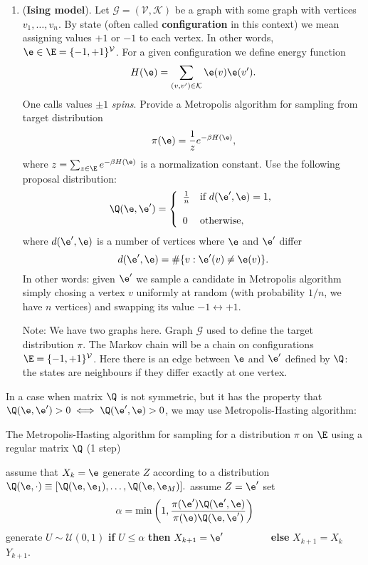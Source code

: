 \documentclass[a4paper,12pt]{article}
\begin{document}
\begin{enumerate}
\item (\textbf{Ising model}). Let $\mathcal{G}=(\mathcal{V},\mathcal{K})$ be a graph with some graph with vertices $v_1,\ldots,v_n$. 
By state (often called \textbf{configuration} in this context) we mean assigning values $+1$ or $-1$ to each vertex. In other words, $\e\in\E=\{-1,+1\}^\mathcal{V}$. For a given configuration we define energy function
$$H(\e)=\sum_{(v,v')\in \mathcal{K}} \e(v)\e(v').$$
One calls values $\pm 1$ \textsl{spins}. Provide a Metropolis algorithm for sampling
from target distribution 
$$\pi(\e)={1\over z} e^{-\beta H(\e)},$$
where $z=\sum_{z\in\E}e^{-\beta H(\e)}$ is a normalization constant.
Use the following proposal distribution:
$$\Q(\e,\e')=
\left\{
\begin{array}{llll}
{1\over n} & \textrm{if } d(\e',\e)=1,\\[12pt]
0 & \textrm{otherwise},
\end{array}
\right.$$ 
where $d(\e',\e)$ is a number of vertices where $\e$ and $\e'$ differ
$$d(\e',\e)=\#\{v: \e'(v)\neq \e(v)\}.$$
In other words: given $\e'$ we sample a candidate in Metropolis algorithm simply chosing a vertex $v$ uniformly at random (with probability $1/n$, we have $n$ vertices) and swapping its value $-1 \leftrightarrow +1$.
\smallskip\par 
Note: We have two graphs here. Graph $\mathcal{G}$ used to define the target distribution $\pi$. 
The Markov chain will be a chain on configurations $\E=\{-1,+1\}^\mathcal{V}$. Here there is an edge between 
$\e$ and $\e'$ defined by $\Q$: the states are neighbours if they differ exactly at one vertex.



 
\end{enumerate}

\newpage
In a case when matrix $\Q$ is not symmetric, but it has the property that $\Q(\e,\e')>0 \iff \Q(\e',\e)>0$, we may use Metropolis-Hasting algorithm:
\begin{algorithm}[H]
\caption{The  Metropolis-Hasting algorithm for sampling for a distribution  $\pi$ on $\E$
using a  regular matrix $\Q$ (1 step)}
\label{alg:metropolis-hasting}
\begin{algorithmic}[1]

\STATE assume that  $X_k=\e$
\STATE generate $Z$ according to a distribution  $\Q(\e,\cdot)\equiv [\Q(\e,\e_1),\ldots,\Q(\e,\e_M)].$
\STATE assume $Z=\e'$
\STATE set   $$\alpha=\min\left(1,{\pi(\e')\Q(\e',\e) \over \pi(\e)\Q(\e,\e')}\right)$$ %
\label{alg:mh_line_alpha}
\STATE generate $U\sim \mathcal{U}(0,1)$
\STATE \textbf{if} $U\leq \alpha$ \textbf{then} $X_{k+1}=\e'$
\STATE $\qquad \qquad $ \textbf{else}  $X_{k+1}=X_k$
\RETURN $Y_{k+1}$.
\end{algorithmic}
\end{algorithm}
\end{document}

